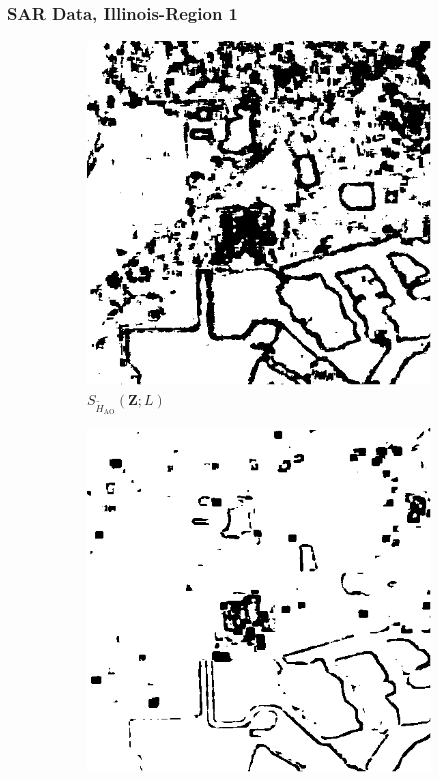 \documentclass[aspectratio=1610,10pt]{beamer}
\begin{document}
\begin{frame} \frametitle{\large{SAR Data, Illinois-Region 1 }}\vspace{-0.1cm}
\begin{figure}[H]
  \centering
  \begin{subfigure}[b]{0.3\textwidth}
    \centering
    \includegraphics[width=\textwidth]{../../Figures/PNG/H_005_lake_512_36L_AO_100b}
    \caption{$S_{\widetilde{H}_{\text{AO}}}(\bm{Z}; L)$}
    \label{fig:lake_0.05-1}
  \end{subfigure}
  \hfill
  \begin{subfigure}[b]{0.3\textwidth}
    \centering
    \includegraphics[width=\textwidth]{../../Figures/PNG/cv_005_pvalues_lake_512}

\end{subfigure}
\end{figure}
\end{frame}
\end{document}
